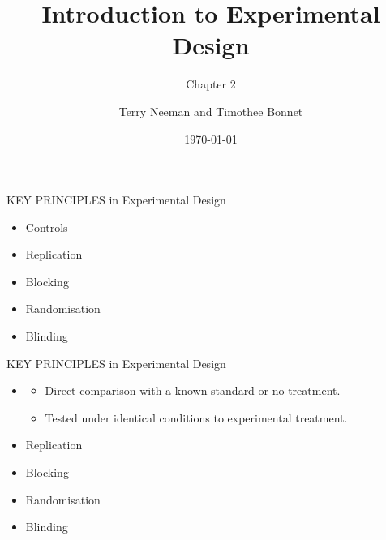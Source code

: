 \documentclass{beamer}
\title{Introduction to Experimental Design}
\subtitle{Chapter 2}
\author{Terry Neeman and Timothee Bonnet}
\date{\today}
\begin{document}



\begin{frame}{}
\maketitle

\end{frame}

\begin{frame}{KEY PRINCIPLES in Experimental Design}

\begin{alertblock}{}
 \begin{itemize}
  \item Controls
  \item Replication
  \item Blocking
  \item Randomisation
  \item Blinding
 \end{itemize}

\end{alertblock}

\end{frame}


\begin{frame}{KEY PRINCIPLES in Experimental Design}

\begin{alertblock}{}
 \begin{itemize}
  \item {\color{red}{Controls}}
    \begin{itemize}
     \item Direct comparison with a known standard or no treatment.
      \item Tested under identical conditions to experimental treatment.
    \end{itemize}
  \item Replication
  \item Blocking
  \item Randomisation
  \item Blinding
 \end{itemize}

\end{alertblock}

\end{frame}
\end{document}
